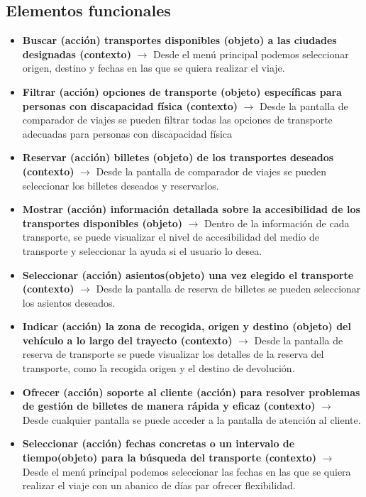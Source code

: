 \subsection{Elementos funcionales}
\begin{itemize}
      \item \textbf{Buscar (acción) transportes disponibles (objeto) a las ciudades designadas (contexto)} $\rightarrow$ Desde el menú principal podemos seleccionar
            origen, destino y fechas en las que se quiera realizar el viaje.
      \item \textbf{Filtrar (acción) opciones de transporte (objeto) específicas para personas con discapacidad física (contexto)} $\rightarrow$ Desde la pantalla
            de comparador de viajes se pueden filtrar todas las opciones de transporte adecuadas para personas con discapacidad física
      \item \textbf{Reservar (acción) billetes (objeto) de los transportes deseados (contexto)} $\rightarrow$ Desde la pantalla de comparador de viajes se pueden
            seleccionar los billetes deseados y reservarlos.
      \item \textbf{Mostrar (acción) información detallada sobre la accesibilidad de los transportes disponibles (objeto)} $\rightarrow$ Dentro de la información de
            cada transporte, se puede visualizar el nivel de accesibilidad del medio de transporte y seleccionar la ayuda si el usuario lo desea.
      \item \textbf{Seleccionar (acción) asientos(objeto) una vez elegido el transporte (contexto)} $\rightarrow$ Desde la pantalla de reserva de billetes se
            pueden seleccionar los asientos deseados.
      \item \textbf{Indicar (acción) la zona de recogida, origen y destino (objeto) del vehículo a lo largo del trayecto (contexto)} $\rightarrow$ Desde la pantalla
            de reserva de transporte se puede visualizar los detalles de la reserva del transporte, como la recogida origen y el destino de devolución.
      \item \textbf{Ofrecer (acción) soporte al cliente (acción) para resolver problemas de gestión de billetes de manera rápida y eficaz (contexto)} $\rightarrow$ Desde
            cualquier pantalla se puede acceder a la pantalla de atención al cliente.
      \item \textbf{Seleccionar (acción) fechas concretas o un intervalo de tiempo(objeto) para la búsqueda del transporte (contexto)} $\rightarrow$ Desde el menú
            principal podemos seleccionar las fechas en las que se quiera realizar el viaje con un abanico de días par ofrecer flexibilidad.

\end{itemize}
